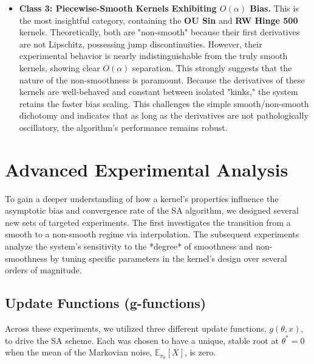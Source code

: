 \documentclass[a4paper]{article}
\begin{document}
\begin{itemize}
\begin{itemize}
		\item \textbf{Class 3: Piecewise-Smooth Kernels Exhibiting \(O(\alpha)\) Bias.} This is the most insightful category, containing the \textbf{OU Sin} and \textbf{RW Hinge 500} kernels. Theoretically, both are "non-smooth" because their first derivatives are not Lipschitz, possessing jump discontinuities. However, their experimental behavior is nearly indistinguishable from the truly smooth kernels, showing clear \(O(\alpha)\) separation. This strongly suggests that the nature of the non-smoothness is paramount. Because the derivatives of these kernels are well-behaved and constant between isolated "kinks," the system retains the faster bias scaling. This challenges the simple smooth/non-smooth dichotomy and indicates that as long as the derivatives are not pathologically oscillatory, the algorithm's performance remains robust.
	\end{itemize}
\end{itemize}

\section*{Advanced Experimental Analysis}

To gain a deeper understanding of how a kernel's properties influence the asymptotic bias and convergence rate of the SA algorithm, we designed several new sets of targeted experiments. The first investigates the transition from a smooth to a non-smooth regime via interpolation. The subsequent experiments analyze the system's sensitivity to the *degree* of smoothness and non-smoothness by tuning specific parameters in the kernel's design over several orders of magnitude.

\subsection*{Update Functions (g-functions)}
Across these experiments, we utilized three different update functions, \(g(\theta, x)\), to drive the SA scheme. Each was chosen to have a unique, stable root at \(\theta^*=0\) when the mean of the Markovian noise, \(\mathbb{E}_{\pi_0}[X]\), is zero.
\end{document}
